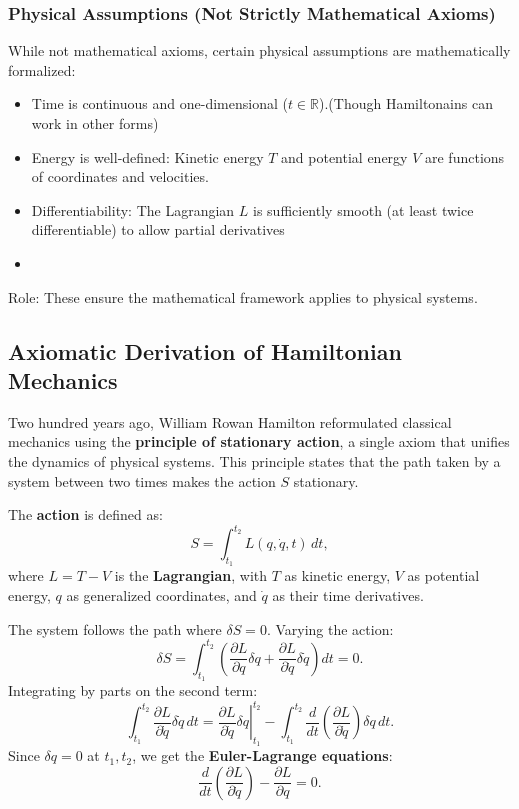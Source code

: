 \subsubsection{Physical Assumptions (Not Strictly Mathematical Axioms)}
While not mathematical axioms, certain physical assumptions are mathematically formalized:
\begin{itemize}
    \item Time is continuous and one-dimensional ($ t \in \mathbb{R} $).(Though Hamiltonains can work in other forms)
    \item Energy is well-defined: Kinetic energy $ T $ and potential energy $ V $ are functions of coordinates and velocities.
    \item Differentiability: The Lagrangian $ L $ is sufficiently smooth (at least twice differentiable) to allow partial derivatives
    \item 

\end{itemize}
Role: These ensure the mathematical framework applies to physical systems.
\subsection{Axiomatic Derivation of Hamiltonian Mechanics}
Two hundred years ago, William Rowan Hamilton reformulated classical mechanics using the \textbf{principle of stationary action}, a single axiom that unifies the dynamics of physical systems. This principle states that the path taken by a system between two times makes the action \( S \) stationary.

The \textbf{action} is defined as:
\[
S = \int_{t_1}^{t_2} L(q, \dot{q}, t) \, dt,
\]
where \( L = T - V \) is the \textbf{Lagrangian}, with \( T \) as kinetic energy, \( V \) as potential energy, \( q \) as generalized coordinates, and \( \dot{q} \) as their time derivatives.

The system follows the path where \( \delta S = 0 \). Varying the action:
\[
\delta S = \int_{t_1}^{t_2} \left( \frac{\partial L}{\partial q} \delta q + \frac{\partial L}{\partial \dot{q}} \delta \dot{q} \right) dt = 0.
\]
Integrating by parts on the second term:
\[
\int_{t_1}^{t_2} \frac{\partial L}{\partial \dot{q}} \delta \dot{q} \, dt = \left. \frac{\partial L}{\partial \dot{q}} \delta q \right|_{t_1}^{t_2} - \int_{t_1}^{t_2} \frac{d}{dt} \left( \frac{\partial L}{\partial \dot{q}} \right) \delta q \, dt.
\]
Since \( \delta q = 0 \) at \( t_1, t_2 \), we get the \textbf{Euler-Lagrange equations}:
\[
\frac{d}{dt} \left( \frac{\partial L}{\partial \dot{q}} \right) - \frac{\partial L}{\partial q} = 0.
\]

